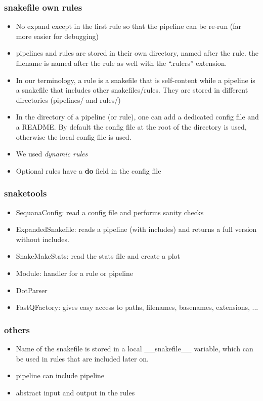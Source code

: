 \documentclass{beamer}
\begin{document}
\begin{frame}
 \frametitle{snakefile own rules}
 \tiny
 \begin{block}{}
  \begin{itemize}
   \item No expand except in the first rule so that the pipeline can be 
     re-run (far more easier for debugging)
   \item pipelines and rules are stored in their own directory, named after the rule. 
   the filename is named after the rule as well with the ``.rulers'' extension.
   \item In our terminology, a rule is a snakefile that is self-content while
   a pipeline is a snakefile that includes other snakefiles/rules. They are stored
   in different directories (pipelines/ and rules/)
   \item In the directory of a pipeline (or rule), one can add a dedicated config 
   file and a README. By default the config file at the root of the directory is 
   used, otherwise the local config file is used.
   \item We used \textit{dynamic rules}
   \item Optional rules have a \textbf{do} field in the config file
   \end{itemize}
 \end{block} 
\end{frame}



\begin{frame}
\frametitle{snaketools}
 \begin{block}{}
 \begin{itemize}
  \item SequanaConfig: read a config file and performs sanity checks
  \item ExpandedSnakefile: reads a pipeline (with includes) and returns a full version
  without includes.
  \item SnakeMakeStats: read the stats file and create a plot
  \item Module: handler for a rule or pipeline
  \item DotParser
  \item FastQFactory: gives easy access to paths, filenames, basenames, extensions, ...
  \end{itemize}
 \end{block} 
\end{frame}


\begin{frame}
 \frametitle{others}
 \begin{block}{}
 \begin{itemize}
  \item Name of the snakefile is stored in a local \_\_snakefile\_\_ variable, which can be
 used in rules that are included later on.
 \item pipeline can include pipeline
 \item abstract input and output in the rules
 \end{itemize}
 \end{block}
\end{frame}
\end{document}
